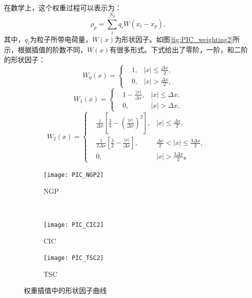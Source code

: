{在数学上，这个权重过程可以表示为：
\begin{equation}\label{eq:weight}
  \rho_p=\sum_{i}^{N_p} q_i W(x_i-x_p),
\end{equation}
其中，$q_i$为粒子所带电荷量，$W(x)$为形状因子。如图\eqref{fig:PIC_weighting2}所示，根据插值的阶数不同，$W(x)$有很多形式。下式给出了零阶，一阶，和二阶的形状因子：
\begin{equation}\label{eq:NGP}
  W_0(x)=\left\{
  \begin{aligned}
  &1, &\left| x \right| \leqslant \frac{\Delta x}{2}, \\
  &0, &\left| x \right| >         \frac{\Delta x}{2},
  \end{aligned}
  \right.
\end{equation}
\begin{equation}\label{eq:CIC}
  W_1(x)=\left\{
  \begin{aligned}
  &1-\frac{\left| x \right|}{\Delta x}, &\left| x \right| \leqslant \Delta x ,\\
  &0                                  , &\left| x \right| >         \Delta x ,
  \end{aligned}
  \right.
\end{equation}
\begin{equation}\label{eq:TSC}
  W_2(x)=\left\{
  \begin{aligned}
  &\frac{1}{ \Delta x} \left[\frac{3}{4}-(\frac{\left| x \right|}{\Delta x})^2 \right], &\left| x \right| \leqslant \frac{\Delta x}{2} ,\qquad \quad \\
  &\frac{1}{2\Delta x} \left[\frac{3}{2}- \frac{\left| x \right|}{\Delta x}    \right], &\frac{\Delta x}{2} < \left| x \right| \leqslant \frac{3\Delta x}{2}, \\
  &0,                                                                                   &\left| x \right| > \frac{3\Delta x}{2}\text{。}\qquad \ \
  \end{aligned}
  \right.
\end{equation}


\begin{figure}[!htbp]
  \centering
  \begin{subfigure}[b]{0.8\textwidth}
    \texttt{[image: PIC\_NGP2]}
    \caption{NGP}
    \label{fig:PIC_NGP2}
  \end{subfigure}%
  ~%
  \begin{subfigure}[b]{0.8\textwidth}
    \texttt{[image: PIC\_CIC2]}
    \caption{CIC}
    \label{fig:PIC_CIC2}
  \end{subfigure}
  \begin{subfigure}[b]{0.8\textwidth}
    \texttt{[image: PIC\_TSC2]}
    \caption{TSC}
    \label{fig:PIC_TSC2}
  \end{subfigure}%
  \caption{权重插值中的形状因子曲线}
  \label{fig:PIC_weighting2}
\end{figure}

}
